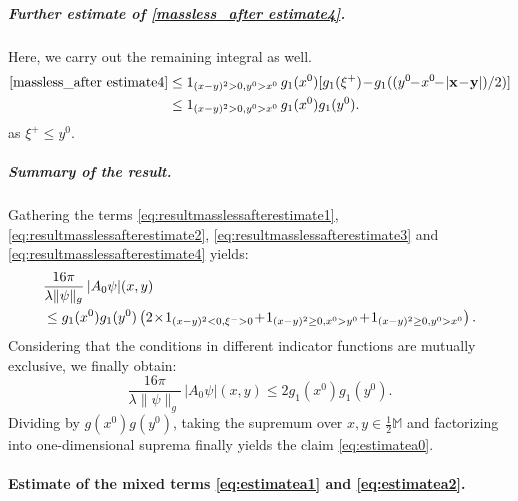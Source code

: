 \documentclass[b5paper,draft,openbib,12pt]{memoir}
\newcommand{\M}{\mathbb{M}}
\newcommand{\vx}{\mathbf{x}}
\newcommand{\vy}{\mathbf{y}}
\begin{document}
\subparagraph{Further estimate of \eqref{massless_after estimate4}.}
Here, we carry out the remaining integral as well.
\begin{align}
	\eqref{massless_after estimate4} &\leq 1_{(x-y)^2>0,y^0>x^0}\, g_1(x^0) [ g_1(\xi^+)\!-\!g_1( (y^0\!\!-\!x^0\!\!-\!|\vx\!-\!\vy|)/2)]\nonumber\\
&\leq 1_{(x-y)^2>0,y^0>x^0}\, g_1(x^0)g_1(y^0).
\label{eq:resultmasslessafterestimate4}
\end{align}
as $\xi^+\leq y^0$.


\subparagraph{Summary of the result.} Gathering the terms 
\eqref{eq:resultmasslessafterestimate1}, 
\eqref{eq:resultmasslessafterestimate2}, 
\eqref{eq:resultmasslessafterestimate3} and 
\eqref{eq:resultmasslessafterestimate4} yields:
\begin{align}
    &\frac{16\pi}{\lambda\|\psi\|_g}\, |A_0 \psi |(x,y) \\
    &\leq g_1(x^0) g_1(y^0) \left( 2 \!\times\! 1_{(x-y)^2 < 0, \xi^- >0} \!+\! 1_{(x-y)^2\ge0,x^0>y^0} \!+\! 1_{(x-y)^2\ge0,y^0>x^0}\right).\notag
\end{align}
Considering that the conditions in different indicator functions are mutually 
exclusive, we finally obtain:
\begin{equation}
	  \frac{16\pi}{\lambda\|\psi\|_g}\, |A_0 \psi |(x,y) \leq 2 g_1(x^0) g_1(y^0).
	\label{eq:resultmasslessestimate}
\end{equation}
Dividing by $g(x^0)g(y^0)$, taking the supremum over 
$x,y \in \tfrac{1}{2}\M$ and factorizing into one-dimensional suprema 
finally yields the claim \eqref{eq:estimatea0}.


\paragraph{Estimate of the mixed terms \eqref{eq:estimatea1} and 
\eqref{eq:estimatea2}.} \label{sec:estimatemixed}
\end{document}

